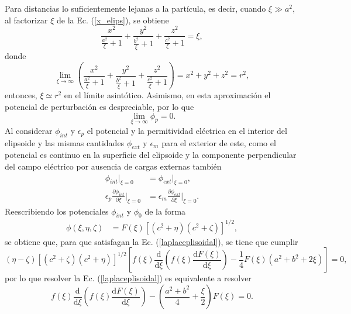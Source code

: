 \noindent Para distancias lo suficientemente lejanas a la partícula, es decir, cuando $\xi\gg a^2$, al factorizar $\xi$ de  la Ec. (\ref{x_elips}), se obtiene
\begin{equation*}
    \frac{x^2}{\frac{a^2}{\xi}+1}+\frac{y^2}{\frac{b^2}{\xi}+1}+\frac{z^2}{\frac{c^2}{\xi}+1}=\xi,
\end{equation*}
donde
\begin{equation*}
    \lim_{\xi\rightarrow\infty}\left(\frac{x^2}{\frac{a^2}{\xi}+1}+\frac{y^2}{\frac{b^2}{\xi}+1}+\frac{z^2}{\frac{c^2}{\xi}+1}\right)=x^2+y^2+z^2=r^2,
\end{equation*}
entonces, $\xi \simeq r^2$ en el límite asintótico. Asimismo, en esta aproximación el potencial de perturbación es despreciable, por lo que 
\begin{equation}
\lim_{\xi\rightarrow\infty}\phi_p=0
\label{limitephi_p}.
\end{equation}
Al considerar $\phi_{int}$ y $\epsilon_p$ el potencial y la permitividad eléctrica en el interior del elipsoide y las mismas cantidades $\phi_{ext}$ y $\epsilon_m$ para el exterior de este, como el potencial es continuo en la superficie del elipsoide y la componente perpendicular del campo eléctrico por ausencia de cargas externas también \cite{Griffiths}
\begin{subequations}
\label{condicionesfrontera}
\begin{align}
    \phi_{int}|_{\xi=0}&=\phi_{ext}|_{\xi=0}\label{cf1},\\
    \epsilon_p\frac{\partial \phi_{int}}{\partial \xi}\Big |_{\xi=0}&=
    \epsilon_m\frac{\partial \phi_{ext}}{\partial \xi}\Big |_{\xi=0}\label{cf2}.
\end{align}
\end{subequations}
Reescribiendo los potenciales $\phi_{int}$ y $\phi_0$ de la forma
\begin{align}
    \phi(\xi,\eta,\zeta)&=F(\xi)[(c^2+\eta)(c^2+\zeta)]^{1/2}, 
    \label{phi0 con F}
\end{align}
se obtiene que, para que satisfagan la Ec. (\ref{laplaceplisoidal}), se tiene que cumplir 
\begin{equation}
  (\eta-\zeta)[(c^2+\zeta)(c^2+\eta)]^{1/2}\left[f(\xi)\frac{\text{d}}{\text{d}\xi}\left(f(\xi)\frac{ \text{d} F(\xi)}{\text{d}\xi}\right)-\frac{1}{4}F(\xi)(a^2+b^2+2\xi)\right]=0,
\end{equation}
por lo que resolver la Ec. (\ref{laplaceplisoidal}) es equivalente a resolver
\begin{equation}
    f(\xi)\frac{\text{d}}{\text{d}\xi}\left(f(\xi)\frac{ \text{d} F(\xi)}{\text{d}\xi}\right)-\left(\frac{a^2+b^2}{4}+\frac{\xi}{2}\right)F(\xi)=0.
    \label{ecsimpli}
\end{equation}
